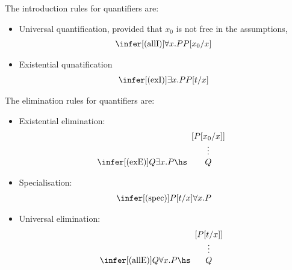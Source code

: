\documentclass{article}
\begin{document}
\begin{definition}
    The introduction rules for quantifiers are:
    \begin{itemize}
        \item Universal quantification, provided that $x_0$ is not free in the assumptions, \begin{align*}
                  \infer[(\text{allI})]{\forall x. P}{P[x_0/x]}
              \end{align*}
        \item Existential qunatification \begin{align*}
                  \infer[(\text{exI})]{\exists x.P}{P[t/x]}
              \end{align*}
    \end{itemize}
\end{definition}

\begin{definition}
    The elimination rules for quantifiers are:
    \begin{itemize}
        \item Existential elimination: \begin{align*}
                  \infer[(\text{exE})]{Q}{\exists x.P\hs \begin{array}[b]{c}
                          [P[x_0/x]] \\
                          \vdots     \\
                          Q
                      \end{array}}
              \end{align*}
        \item Specialisation: \begin{align*}
                  \infer[(\text{spec})]{P[t/x]}{\forall x.P}
              \end{align*}
        \item Universal elimination: \begin{align*}
                  \infer[(\text{allE})]{Q}{\forall x.P\hs \begin{array}[b]{c}
                          [P[t/x]] \\
                          \vdots   \\
                          Q
                      \end{array}}
              \end{align*}
    \end{itemize}
\end{definition}
\end{document}
